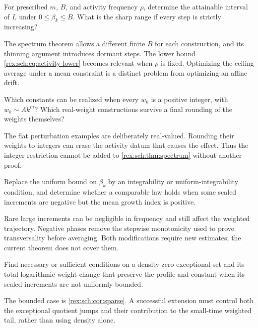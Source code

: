 \begin{question}\label{rex:sch:q:fixedB}
For prescribed $m$, $B$, and activity frequency $\rho$, determine
the attainable interval of $L$ under $0\leq\beta_k\leq B$.
What is the sharp range if every step is strictly increasing?
\end{question}

The spectrum theorem allows a different finite $B$ for each
construction, and its thinning argument introduces dormant steps.
The lower bound \eqref{rex:sch:eq:activity-lower} becomes relevant when
$\rho$ is fixed. Optimizing the ceiling average under a mean
constraint is a distinct problem from optimizing an affine drift.

\begin{question}\label{rex:sch:q:integer}
Which constants can be realized when every $w_k$ is a positive
integer, with $w_k\sim A k^m$? Which real-weight constructions
survive a final rounding of the weights themselves?
\end{question}

The flat perturbation examples are deliberately real-valued.
Rounding their weights to integers can erase the activity datum
that causes the effect. Thus the integer restriction cannot be
added to \cref{rex:sch:thm:spectrum} without another proof.

\begin{question}\label{rex:sch:q:unbounded}
Replace the uniform bound on $\beta_k$ by an integrability or
uniform-integrability condition, and determine whether a comparable
law holds when some scaled increments are negative but the mean
growth index is positive.
\end{question}

Rare large increments can be negligible in frequency and still
affect the weighted trajectory. Negative phases remove the
stepwise monotonicity used to prove transversality before
averaging. Both modifications require new estimates; the current
theorem does not cover them.

\begin{question}\label{rex:sch:q:sparse}
Find necessary or sufficient conditions on a density-zero
exceptional set and its total logarithmic weight change that
preserve the profile and constant when its scaled increments are
not uniformly bounded.
\end{question}

The bounded case is \cref{rex:sch:cor:sparse}. A successful extension
must control both the exceptional quotient jumps and their
contribution to the small-time weighted tail, rather than using
density alone.

